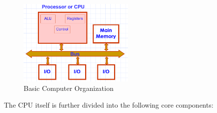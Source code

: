 \documentclass[12pt]{book}
\begin{document}
\begin{figure}[H]
    \centering
    \includegraphics[width=0.5\textwidth]{images/computer_organization.png}
    \caption{Basic Computer Organization}
    \label{fig:computer_organization}
\end{figure}

The CPU itself is further divided into the following core components:
\end{document}
